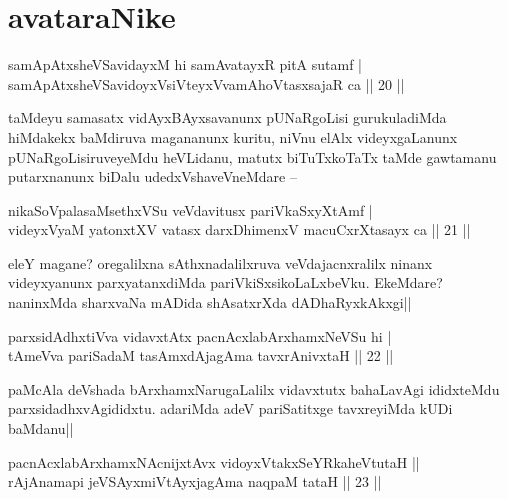 \section*{avataraNike}

\begin{shl}
samApAtxsheVSavidayxM hi samAvatayxR pitA sutamf | \\
samApAtxsheVSavidoyxV\s siVteyxVvamAhoVtasxsajaR ca \hfill|| 20 || 
\end{shl}

\begin{artha}
taMdeyu samasatx vidAyxBAyxsavanunx pUNaRgoLisi gurukuladiMda 
hiMdakekx baMdiruva magananunx kuritu, niVnu elAlx videyxgaLanunx 
pUNaRgoLisiruveyeMdu heVLidanu, matutx biTuTxkoTaTx taMde gawtamanu 
putarxnanunx biDalu udedxVshaveVneMdare --
\end{artha}

\begin{shl}
nikaSoVpalasaMsethxVSu veVdavitusx pariVkaSxyXtAmf | \\
videyxVyaM yatonxtXV vatasx darxDhimenxV macuCxrXtasayx ca \hfill|| 21 || 
\end{shl}

\begin{artha}
eleY magane? oregalilxna sAthxnadalilxruva veVdajacnxralilx ninanx 
videyxyanunx parxyatanxdiMda pariVkiSxsikoLaLxbeVku. EkeMdare? 
naninxMda sharxvaNa mADida shAsatxrXda dADhaRyxkAkxgi||
\end{artha}


\begin{shl}
parxsidAdhx\s tiVva vidavxtAtx pacnAcxlabArxhamxNeVSu hi | \\
tAmeVva pariSadaM tasAmxdAjagAma tavxrAnivxtaH \hfill|| 22 || 
\end{shl}

\begin{artha}
paMcAla deVshada bArxhamxNarugaLalilx vidavxtutx bahaLavAgi ididxteMdu 
parxsidadhxvAgididxtu. adariMda adeV pariSatitxge tavxreyiMda kUDi 
baMdanu||
\end{artha}


\begin{shl}
pacnAcxlabArxhamxNAcnijxtAvx vidoyxVtakxSeYRkaheVtutaH || \\
rAjAnamapi jeVSAyxmiVtAyxjagAma naqpaM tataH \hfill|| 23 || 
\end{shl}

